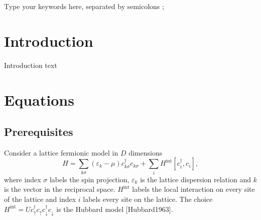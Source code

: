 \documentclass[3p,times,procedia]{elsarticle}
\begin{document}
\begin{frontmatter}
\begin{keyword}
Type your keywords here, separated by semicolons ; 




\end{keyword}
\end{frontmatter}




\vspace*{-8pt}
\section{Introduction}
Introduction 
\vspace{5em}
text
\section{Equations}
\subsection{Prerequisites}
Consider a lattice fermionic model in $D$ dimensions
\begin{equation}
H = \sum_{k\sigma} (\varepsilon_k - \mu) c^\dagger_{k\sigma} c_{k\sigma} + \sum_i H^{\mathrm{int}} [c^\dagger_i, c_i],
\end{equation}
where index $\sigma$ labels the spin projection, $\varepsilon_k$ is the lattice dispersion relation and $k$ is the vector in the reciprocal space. 
$H^{\mathrm{int}}$ labels the local interaction on every site of the lattice and index $i$ labels every site on the lattice. 
The choice $H^{\mathrm{int}} = U c^\dagger_\uparrow c_\uparrow c^\dagger_\downarrow c_\downarrow$ is the Hubbard model [Hubbard1963]. 
\end{document}

